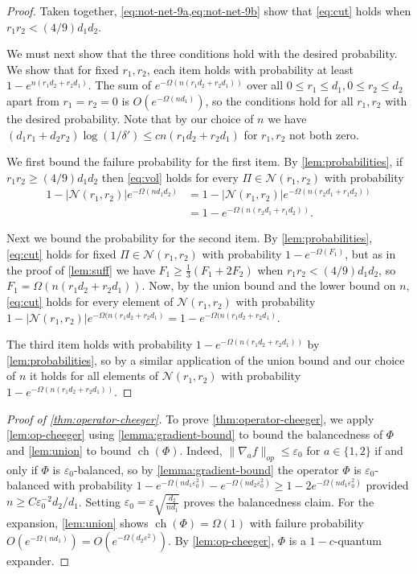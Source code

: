 \documentclass{article}
\newcommand{\ch}{\operatorname{ch}}
\newcommand\eps{\varepsilon}
\newcommand\cN{\mathcal{N}}
\begin{document}
\begin{proof}
Taken together, \cref{eq:not-net-9a,eq:not-net-9b} show that \cref{eq:cut} holds when $r_1 r_2 < (4/9) d_1 d_2$.

We must next show that the three conditions hold with the desired probability. We show that for fixed $r_1, r_2$, each item holds with probability at least $1 - e^{n (r_1 d_2 + r_2 d_1)}$. The sum of $e^{-\Omega(n (r_1d_2 + r_2 d_1))}$ over all $0 \leq r_1 \leq d_1, 0 \leq r_2 \leq d_2$ apart from $r_1 = r_2 = 0$ is $O(e^{- \Omega( n d_1)})$, so the conditions hold for all $r_1, r_2$ with the desired probability. Note that by our choice of $n$ we have $(d_1r_1 + d_2 r_2) \log(1/\delta') \leq c n (r_1d_2 + r_2 d_1)$ for $r_1, r_2$ not both zero.

We first bound the failure probability for the first item. By \cref{lem:probabilities}, if $r_1 r_2 \geq (4/9) d_1 d_2$ then \cref{eq:vol} holds for every $\Pi \in \cN(r_1, r_2)$ with probability
\begin{align*}
1 - |\cN(r_1, r_2)|e^{- \Omega( n d_1 d_2) } &= 1 - |\cN(r_1, r_2)| e^{ - \Omega(n (r_2d_1 + r_1d_2))}\\
&= 1 - e^{ - \Omega(n (r_2d_1 + r_1d_2))}.
\end{align*}

Next we bound the probability for the second item. By \cref{lem:probabilities}, \cref{eq:cut} holds for fixed $\Pi \in \cN(r_1, r_2)$ with probability $1 - e^{-\Omega( F_1)}$, but as in the proof of \cref{lem:suff} we have $F_1 \geq \frac{1}{3} (F_1 + 2 F_2)$ when $r_1 r_2 < (4/9) d_1 d_2$, so $F_1 = \Omega(n (r_1d_2 + r_2 d_1))$. Now, by the union bound and the lower bound on $n$, \cref{eq:cut} holds for every element of $\cN(r_1, r_2)$ with probability $1 - |\cN(r_1,r_2)| e^{-\Omega(n (r_1d_2 + r_2 d_1)} = 1 - e^{-\Omega(n (r_1d_2 + r_2 d_1)}$.


The third item holds with probability $1 - e^{-\Omega(n (r_1d_2 + r_2 d_1))}$ by \cref{lem:probabilities}, so by a similar application of the union bound and our choice of $n$ it holds for all elements of $\cN(r_1, r_2)$ with probability $1 - e^{-\Omega(n (r_1d_2 + r_2 d_1))}$. \end{proof}

\begin{proof}[Proof of \cref{thm:operator-cheeger}]
To prove \cref{thm:operator-cheeger}, we apply \cref{lem:op-cheeger} using \cref{lemma:gradient-bound} to bound the balancedness of $\Phi$ and \cref{lem:union} to bound $\ch(\Phi)$. Indeed, $\|\nabla_a f\|_{op} \leq \eps_0$ for $a \in \{1,2\}$ if and only if $\Phi$ is $\eps_0$-balanced, so by \cref{lemma:gradient-bound} the operator $\Phi$ is $\eps_0$-balanced with probability $1 -  e^{-\Omega(n d_1 \eps_0^2)} - e^{-\Omega(n d_2 \eps_0^2)} \geq 1 - 2e^{-\Omega(n d_1 \eps_0^2)}$ provided $n \geq C\eps_0^{-2} d_2/d_1 $. Setting $\eps_0 = \eps \sqrt{\frac{d_2 }{n d_1}}$ proves the balancedness claim. For the expansion, \cref{lem:union} shows $\ch(\Phi) = \Omega(1)$ with failure probability $O(e^{- \Omega(n d_1)}) = O(e^{- \Omega(d_2 \eps^2)})$. By \cref{lem:op-cheeger}, $\Phi$ is a $1 - c$-quantum expander.
\end{proof}
\end{document}
